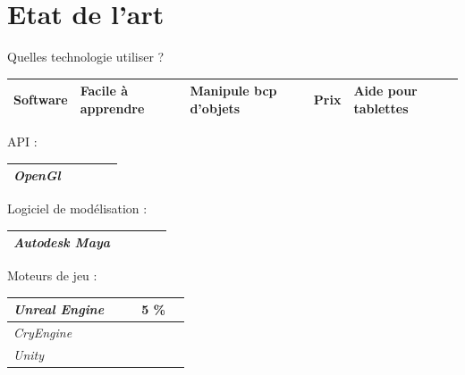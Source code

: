 \documentclass[a4paper,10pt]{beamer}
\begin{document}
	\section{Etat de l'art}
	
		\begin{frame}{Quelles technologie utiliser ?}
			\begin{tabular}{|M{45pt}|M{50pt}|M{38pt}|M{60pt}|M{30pt}|}
				\hline
				\textbf{Software} & \textbf{Facile à apprendre} & \textbf{Manipule bcp d'objets} & \textbf{Prix} & \textbf{Aide pour tablettes}\\
				\hline
			\end{tabular}
			\smallbreak
			API :
			\begin{tabular}{|M{45pt}|M{50pt}|M{38pt}|M{60pt}|M{30pt}|}
				\hline
				\textit{OpenGl} & \color{red}{$\times$} & \color{orange}{$\sim$} & \color{green}{0\euro} & \color{red}{$\times$}\\
				\hline
			\end{tabular}
			\smallbreak
			Logiciel de modélisation :
			\begin{tabular}{|M{45pt}|M{50pt}|M{38pt}|M{60pt}|M{30pt}|}
				\hline
				\textit{Autodesk Maya} & \color{red}{$\times$} & \color{green}{\checkmark} & \color{red}{\$185.00/mois} & \color{orange}{$\sim$}\\
				\hline
			\end{tabular}
			\smallbreak
			Moteurs de jeu :
			\begin{tabular}{|M{45pt}|M{50pt}|M{38pt}|M{60pt}|M{30pt}|}
				\hline
				\textit{Unreal Engine} & \color{green}{\checkmark} & \color{green}{\checkmark} & \color{orange}5 \% & \color{red}{$\times$}\\
				\hline
				\textit{CryEngine} & \color{green}{\checkmark} & \color{green}{\checkmark} & \color{orange}{9.99\euro/mois} & \color{orange}{$\sim$}\\
				\hline
				\textit{Unity} & \color{green}{\checkmark} & \color{green}{\checkmark} & \color{green}{0\euro : licence gratuite} & \color{green}{\checkmark} \\
				\hline
			\end{tabular}
		\end{frame}
		
\end{document}

